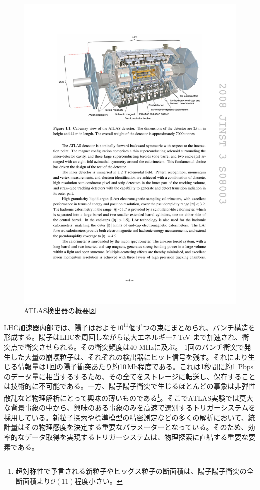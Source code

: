 \begin{figure} 
    \centering
    \includegraphics[width=16cm]{fig/Intro/ATLASdetector.pdf}
    \caption[ATLAS検出器の概要]{ATLAS検出器の概要図\cite{JINST:2008}}
    \label{ATLASdetector}
\end{figure}

LHC加速器内部では、陽子はおよそ$10 ^ {11}$個ずつの束にまとめられ、バンチ構造を形成する。陽子はLHCを周回しながら最大エネルギー7 TeV まで加速され、衝突点で衝突させられる。その衝突頻度は40 MHzに及ぶ。
1回のバンチ衝突で発生した大量の崩壊粒子は、それぞれの検出器にヒット信号を残す。それにより生じる情報量は1回の陽子衝突あたり約10\,Mb程度である。これは1秒間に約1 Pbpsのデータ量に相当するするため、その全てをストレージに転送し、保存することは技術的に不可能である。一方、陽子陽子衝突で生じるほとんどの事象は非弾性散乱など物理解析にとって興味の薄いものである\footnote{超対称性で予言される新粒子やヒッグス粒子の断面積は、陽子陽子衝突の全断面積より$\mathcal{O}(11)$程度小さい。}。そこでATLAS実験では莫大な背景事象の中から、興味のある事象のみを高速で選別するトリガーシステムを採用している。新粒子探索や標準模型の精密測定などの多くの解析において、統計量はその物理感度を決定する重要なパラメーターとなっている。そのため、効率的なデータ取得を実現するトリガーシステムは、物理探索に直結する重要な要素である。


